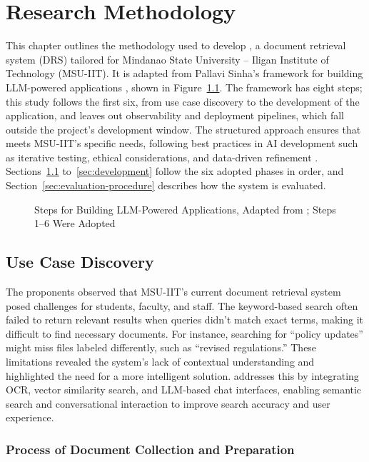 \chapter{Research Methodology}\label{ch:methodology}

This chapter outlines the methodology used to develop \cs{}, a document retrieval system (DRS) tailored for Mindanao State University -- Iligan Institute of Technology (MSU-IIT). It is adapted from Pallavi Sinha's framework for building LLM-powered applications \citep{sinha2024}, shown in Figure~\ref{fig:sinha}. The framework has eight steps; this study follows the first six, from use case discovery to the development of the application, and leaves out observability and deployment pipelines, which fall outside the project's development window. The structured approach ensures that \cs{} meets MSU-IIT's specific needs, following best practices in AI development such as iterative testing, ethical considerations, and data-driven refinement \citep{amershi2019}. Sections~\ref{sec:use-case} to~\ref{sec:development} follow the six adopted phases in order, and Section~\ref{sec:evaluation-procedure} describes how the system is evaluated.

\begin{figure}[htbp]
  \centering
  
  \caption{Steps for Building LLM-Powered Applications, Adapted from \citet{sinha2024}; Steps 1--6 Were Adopted}\label{fig:sinha}
\end{figure}

\section{Use Case Discovery}\label{sec:use-case}

The proponents observed that MSU-IIT's current document retrieval system posed challenges for students, faculty, and staff. The keyword-based search often failed to return relevant results when queries didn't match exact terms, making it difficult to find necessary documents. For instance, searching for ``policy updates'' might miss files labeled differently, such as ``revised regulations.'' These limitations revealed the system's lack of contextual understanding and highlighted the need for a more intelligent solution. \cs{} addresses this by integrating OCR, vector similarity search, and LLM-based chat interfaces, enabling semantic search and conversational interaction to improve search accuracy and user experience.

\subsection{Process of Document Collection and Preparation}\label{sec:collection}

